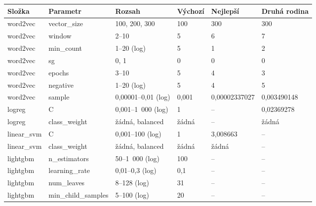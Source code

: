 \begin{tabular}{llllll}
\toprule
Složka & Parametr & Rozsah & Výchozí & Nejlepší & Druhá rodina\\
\midrule
word2vec & vector\_size & 100, 200, 300 & 100 & 300 & 300\\
word2vec & window & 2–10 & 5 & 6 & 7\\
word2vec & min\_count & 1–20 (log) & 5 & 1 & 2\\
word2vec & sg & 0, 1 & 0 & 0 & 0\\
word2vec & epochs & 3–10 & 5 & 4 & 3\\
word2vec & negative & 1–20 (log) & 5 & 4 & 5\\
word2vec & sample & 0,00001–0,01 (log) & 0,001 & 0,00002337027 & 0,003490148\\
logreg & C & 0,001–1 000 (log) & 1 & – & 0,02369278\\
logreg & class\_weight & žádná, balanced & žádná & – & žádná\\
linear\_svm & C & 0,001–100 (log) & 1 & 3,008663 & –\\
linear\_svm & class\_weight & žádná, balanced & žádná & žádná & –\\
lightgbm & n\_estimators & 50–1 000 (log) & 100 & – & –\\
lightgbm & learning\_rate & 0,01–0,3 (log) & 0,1 & – & –\\
lightgbm & num\_leaves & 8–128 (log) & 31 & – & –\\
lightgbm & min\_child\_samples & 5–100 (log) & 20 & – & –\\
\bottomrule
\end{tabular}

